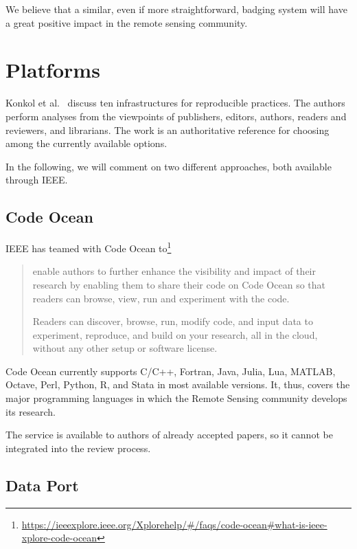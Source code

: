 \documentclass[journal,twoside]{IEEEtran}
\begin{document}
We believe that a similar, even if more straightforward, badging system will have a great positive impact in the remote sensing community.

\section{Platforms}\label{Sec:IEEEPlatforms}

Konkol et al.~\cite{PublishingComputationalResearchaReviewofInfrastructuresforReproducibleandTransparentScholarlyCommunication} discuss ten infrastructures for reproducible practices.
The authors perform analyses from the viewpoints of publishers, editors, authors, readers and reviewers, and librarians.
The work is an authoritative reference for choosing among the currently available options.

In the following, we will comment on two different approaches, both available through IEEE.

\subsection{Code Ocean}

IEEE has teamed with Code Ocean to\footnote{\url{https://ieeexplore.ieee.org/Xplorehelp/#/faqs/code-ocean#what-is-ieee-xplore-code-ocean}}
\begin{quote}
	enable authors to further enhance the visibility and impact of their research by enabling them to share their code on Code Ocean so that readers can browse, view, run and experiment with the code.

	Readers can discover, browse, run, modify code, and input data to experiment, reproduce, and build on your research, all in the cloud, without any other setup or software license.
\end{quote}

Code Ocean currently supports 
C/C++, 
Fortran,
Java,
Julia,
Lua,
MATLAB,
Octave,
Perl,
Python,
R, and
Stata in most available versions.
It, thus, covers the major programming languages in which the Remote Sensing community develops its research.

The service is available to authors of already accepted papers, so it cannot be integrated into the review process.

\subsection{Data Port}
\end{document}
